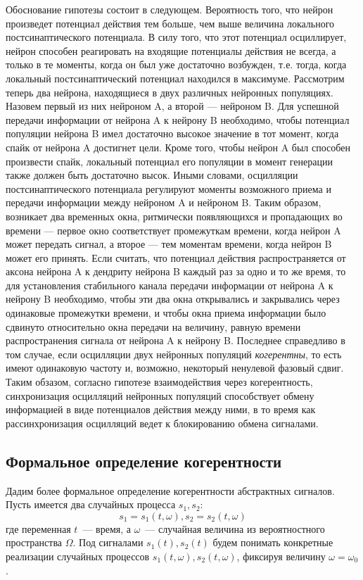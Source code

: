 Обоснование гипотезы состоит в следующем.  Вероятность того, что нейрон
произведет потенциал действия тем больше, чем выше величина локального
постсинаптического потенциала. В силу того, что этот потенциал осциллирует,
нейрон способен реагировать на входящие потенциалы действия не всегда, а только
в те моменты, когда он был уже достаточно возбужден, т.е. тогда, когда
локальный постсинаптический потенциал находился в максимуме. Рассмотрим теперь
два нейрона, находящиеся в двух различных нейронных популяциях. Назовем первый
из них нейроном A, а второй --- нейроном B.  Для успешной передачи информации
от нейрона A к нейрону B необходимо, чтобы потенциал популяции нейрона B имел
достаточно высокое значение в тот момент, когда спайк от нейрона A достигнет
цели. Кроме того, чтобы нейрон A был способен произвести спайк, локальный
потенциал его популяции в момент генерации также должен быть достаточно высок.
Иными словами, осцилляции постсинаптического потенциала регулируют моменты
возможного приема и передачи информации между нейроном A и нейроном B. Таким
образом, возникает два временных окна, ритмически появляющихся и пропадающих во
времени --- первое окно соответствует промежуткам времени, когда нейрон A может
передать сигнал, а второе --- тем моментам времени, когда нейрон B может его
принять.  Если считать, что потенциал действия распространяется от аксона
нейрона A к дендриту нейрона B каждый раз за одно и то же время, то для
установления стабильного канала передачи информации от нейрона A к нейрону B
необходимо, чтобы эти два окна открывались и закрывались через одинаковые
промежутки времени, и чтобы окна приема информации было сдвинуто относительно
окна передачи на величину, равную времени распространения сигнала от нейрона A
к нейрону B.  Последнее справедливо в том случае, если осцилляции двух
нейронных популяций \emph{когерентны}, то есть имеют одинаковую частоту и,
возможно, некоторый ненулевой фазовый сдвиг.  Таким обзазом, согласно гипотезе
взаимодействия через когерентность, синхронизация осцилляций нейронных
популяций способствует обмену информацией в виде потенциалов действия между
ними, в то время как рассинхронизация осцилляций ведет к блокированию обмена
сигналами.


\subsection{Формальное определение когерентности}
Дадим более формальное определение когерентности абстрактных сигналов.
Пусть имеется два случайных процесса $s_1, s_2$:
\begin{equation}
    s_1 = s_1(t,\omega), s_2 = s_2(t,\omega)
\end{equation}
где переменная $t$~--- время, а $\omega$~--- случайная величина из
вероятностного пространства $\Omega$.  Под сигналами $s_1(t), s_2(t)$ будем
понимать конкретные реализации случайных процессов $s_1(t,\omega),
s_2(t,\omega)$, фиксируя величину $\omega = \omega_0$.

